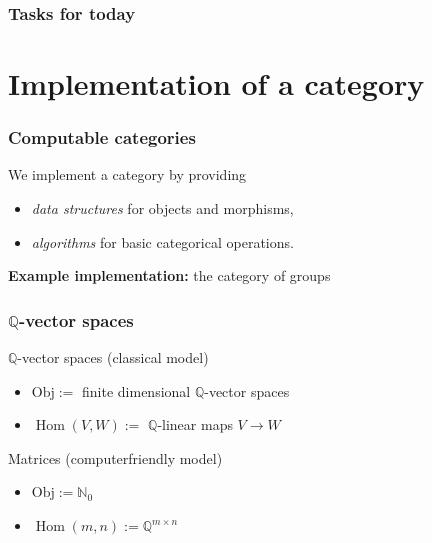 \documentclass{beamer}
\newcommand{\N}{\mathbb{N}}
\newcommand{\Q}{\mathbb{Q}}
\DeclareMathOperator{\Hom}{Hom}
\newcommand{\Obj}{\mathrm{Obj}}
\begin{document}
\begin{frame}
 \frametitle{Tasks for today}
 \tableofcontents
\end{frame}

\section{Implementation of a category}


\begin{frame}
 \frametitle{Computable categories}
 \begin{block}{}
 We implement a category by providing \pause
 \begin{itemize}
  \item \textit{data structures} for objects and morphisms, \pause
  \item \textit{algorithms} for basic categorical operations.\pause
 \end{itemize}
 \end{block}
 \begin{center}
  \textbf{Example implementation:} the category of groups
 \end{center}
\end{frame}


\begin{frame}
  \frametitle{$\Q$-vector spaces}
 \pause
 \begin{block}{$\Q$-vector spaces (classical model)}
  \begin{itemize}
   \item $\Obj := $ finite dimensional $\Q$-vector spaces
   \pause
   \item $\Hom(V,W) := $ $\Q$-linear maps $V \rightarrow W$
  \end{itemize}
 \end{block}
 
 \pause
\pause
  
 \begin{block}{Matrices (computerfriendly model)}
  
  \pause
  \begin{itemize}
   \item {\only<9->{\color{red}}$\Obj := \N_0$}
   \pause
   \item {$\Hom(m,n) := \Q^{m\times n}$}
  \end{itemize}
 \end{block}
 
\end{frame}
\end{document}
